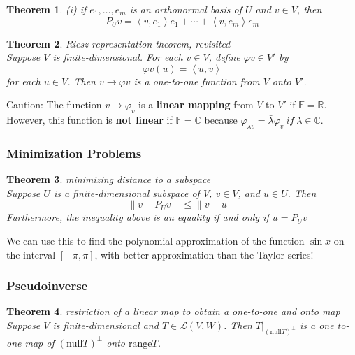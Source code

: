 \documentclass{article}
\newtheorem{theorem}{Theorem}[subsection]
\newcommand{\RR}{\mathbb{R}}
\newcommand{\CC}{\mathbb{C}}
\newcommand{\FF}{\mathbb{F}}
\newcommand{\range}{\text{range}}
\newcommand{\n}{\text{null}}
\begin{document}
\begin{CJK}{UTF8}{gkai}
\begin{theorem}
    (i) if $e_1,\ldots,e_m$ is an orthonormal basis of $U$ and $v \in V$, then
    \[P_Uv = \left<v,e_1\right>e_1 + \cdots+\left<v,e_m\right>e_m\]
\end{theorem}

\begin{theorem}
    Riesz representation theorem, revisited\\

    Suppose $V$ is finite-dimensional. For each $v \in V$, define $\varphi v \in V'$ by
    \[\varphi v(u) = \left<u,v\right>\]
    for each $u \in V$. Then $v \to \varphi v$ is a one-to-one function from $V$ onto $V'$.
\end{theorem}

Caution: The function $v \to \varphi_v$ is a \textbf{linear mapping} from $V$ to $V'$ if $\FF = \RR$. However, this function is \textbf{not linear} if $\FF = \CC$ because $\varphi_{\lambda v} = \bar{\lambda} \varphi_v ~if~ \lambda  \in \CC$.

\subsubsection{Minimization Problems}

\begin{theorem}
    minimizing distance to a subspace\\

    Suppose $U$ is a finite-dimensional subspace of $V$, $v \in V$, and $u \in U$. Then
    \[\|v - P_U v \| \leq \|v- u\|\]
    Furthermore, the inequality above is an equality if and only if $u = P_Uv$
\end{theorem}

We can use this to find the polynomial approximation of the function $\sin x$ on the interval $[-\pi,\pi]$, with better approximation than the Taylor series!

\subsubsection{Pseudoinverse}

\begin{theorem}
    restriction of a linear map to obtain a one-to-one and onto map\\

    Suppose $V$ is finite-dimensional and $T \in \mathcal{L}(V,W)$. Then $T|_{(\n T)^\bot}$ is a one to-one map of $(\n T)^\bot$ onto $\range T$.
\end{theorem}


\end{CJK}
\end{document}
